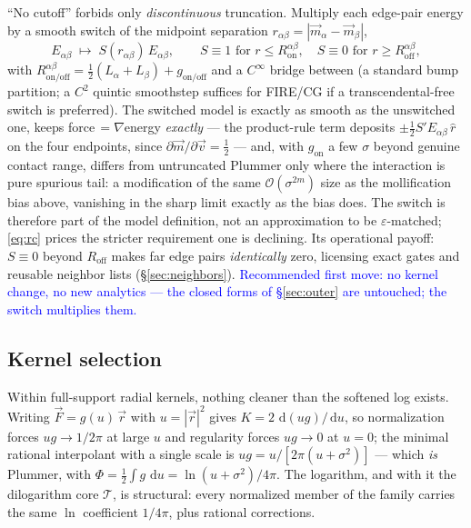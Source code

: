 \documentclass[11pt]{article}
\newcommand{\aside}[1]{\textcolor{blue}{#1}}
\newcommand{\dd}{\,\mathrm{d}}
\begin{document}
``No cutoff'' forbids only \emph{discontinuous} truncation.  Multiply each edge-pair
energy by a smooth switch of the midpoint separation
$r_{\alpha\beta}=|\vec m_\alpha-\vec m_\beta|$,
\begin{equation}
  E_{\alpha\beta}\;\longmapsto\;S(r_{\alpha\beta})\,E_{\alpha\beta},
  \qquad
  S\equiv1 \text{ for } r\le R^{\alpha\beta}_{\text{on}},\quad
  S\equiv0 \text{ for } r\ge R^{\alpha\beta}_{\text{off}},
  \label{eq:switch}
\end{equation}
with $R^{\alpha\beta}_{\text{on/off}}=\tfrac12(L_\alpha{+}L_\beta)+g_{\text{on/off}}$
and a $C^\infty$ bridge between (a standard bump partition; a $C^2$ quintic
smoothstep suffices for FIRE/CG if a transcendental-free switch is preferred).  The
switched model is exactly as smooth as the unswitched one, keeps
force$\,=\nabla$energy \emph{exactly} --- the product-rule term deposits
$\pm\tfrac12 S'E_{\alpha\beta}\,\hat r$ on the four endpoints, since
$\partial\vec m/\partial\vec v=\tfrac12$ --- and, with $g_{\text{on}}$ a few
$\sigma$ beyond genuine contact range, differs from untruncated Plummer only where
the interaction is pure spurious tail: a modification of the same
$\mathcal O(\sigma^{2m})$ size as the mollification bias above, vanishing in the
sharp limit exactly as the bias does.  The switch is therefore part of the model
definition, not an approximation to be $\varepsilon$-matched; \eqref{eq:rc} prices
the stricter requirement one is declining.  Its operational payoff:
$S\equiv0$ beyond $R_{\text{off}}$ makes far edge pairs \emph{identically} zero,
licensing exact gates and reusable neighbor lists (\S\ref{sec:neighbors}).
\aside{Recommended first move: no kernel change, no new analytics --- the closed
forms of \S\ref{sec:outer} are untouched; the switch multiplies them.}

\subsection{Kernel selection}
\label{sec:kernels}

Within full-support radial kernels, nothing cleaner than the softened log exists.
Writing $\vec F=g(u)\,\vec r$ with $u=|\vec r|^2$ gives $K=2\,\dd(ug)/\dd u$, so
normalization forces $ug\to1/2\pi$ at large $u$ and regularity forces $ug\to0$ at
$u=0$; the minimal rational interpolant with a single scale is
$ug=u/[2\pi(u+\sigma^2)]$ --- which \emph{is} Plummer, with
$\Phi=\tfrac12\int g\,\dd u=\ln(u+\sigma^2)/4\pi$.  The logarithm, and with it the
dilogarithm core $\mathcal T$, is structural: every normalized member of the family
carries the same $\ln$ coefficient $1/4\pi$, plus rational corrections.
\end{document}
